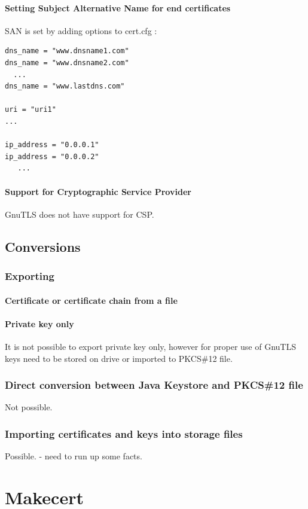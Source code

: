 \documentclass[10pt, a4paper]{report}
\begin{document}
    \subsubsection{Setting Subject Alternative Name for end certificates}
SAN is set by adding options to cert.cfg :
\begin{verbatim}
dns_name = "www.dnsname1.com"
dns_name = "www.dnsname2.com"
  ...
dns_name = "www.lastdns.com"

uri = "uri1"
...

ip_address = "0.0.0.1"
ip_address = "0.0.0.2"
   ...
\end{verbatim}    

    \subsubsection{Support for Cryptographic Service Provider}
GnuTLS does not have support for CSP.
\section{Conversions}

  \subsection{Exporting}
  
    \subsubsection{Certificate or certificate chain from a file}
    
    \subsubsection{Private key only}
It is not possible to export private key only, however for proper use of GnuTLS keys need to be stored on drive or imported to PKCS\#12 file.
  \subsection{Direct conversion between Java Keystore and PKCS\#12 file}
Not possible.
  \subsection{Importing certificates and keys into storage files}
Possible. - need to run up some facts.  



\chapter{Makecert}
\end{document}
